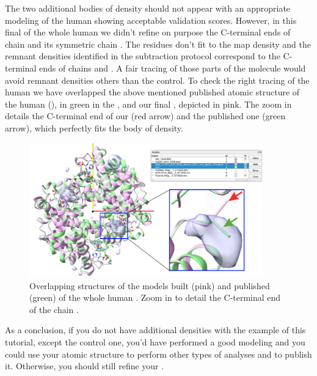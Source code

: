 \begin{itemize}
The two additional bodies of density should not appear with an appropriate modeling of the human  showing acceptable validation scores. However, in this final  of the whole human  we didn't refine on purpose the C-terminal ends of chain  and its symmetric chain . The  residues don't fit to the map density and the remnant densities identified in the subtraction protocol correspond to the C-terminal ends of chains  and . A fair tracing of those parts of the molecule would avoid remnant densities others than the control. To check the right tracing of the human  we have overlapped the above mentioned published atomic structure of the human  (), in green in the , and our final , depicted in pink. The zoom in details the C-terminal end of our  (red arrow) and the published one (green arrow), which perfectly fits the body of density. 

  
  \begin{figure}[H]
    \centering 
    \captionsetup{width=.9\linewidth} 
    \includegraphics[width=0.90\textwidth]{Images/Fig44}
    \caption{Overlapping structures of the models built (pink) and published (green) of the whole human . Zoom in to detail the C-terminal end of the chain .}
    \label{fig:chimera_map_subtract_3}
   \end{figure}

   As a conclusion, if you do not have additional densities with the example of this tutorial, except the control one, you'd have performed a good modeling and you could use your atomic structure to perform other types of analyses and to publish it. Otherwise, you should still refine your .
 
\end{itemize}
